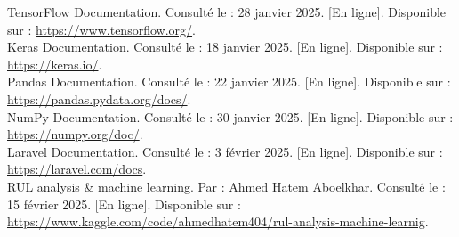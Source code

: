 \noindent [31] TensorFlow Documentation. Consulté le : 28 janvier 2025. [En ligne]. Disponible sur : \url{https://www.tensorflow.org/}.\\

\noindent [32] Keras Documentation. Consulté le : 18 janvier 2025. [En ligne]. Disponible sur : \url{https://keras.io/}.\\

\noindent [33] Pandas Documentation. Consulté le : 22 janvier 2025. [En ligne]. Disponible sur : \url{https://pandas.pydata.org/docs/}.\\

\noindent [34] NumPy Documentation. Consulté le : 30 janvier 2025. [En ligne]. Disponible sur : \url{https://numpy.org/doc/}.\\

\noindent [35] Laravel Documentation. Consulté le : 3 février 2025. [En ligne]. Disponible sur : \url{https://laravel.com/docs}.\\
\noindent [36] RUL analysis & machine learning. Par : Ahmed Hatem Aboelkhar. Consulté le : 15 février 2025. [En ligne]. Disponible sur : \url{https://www.kaggle.com/code/ahmedhatem404/rul-analysis-machine-learnig}.\\